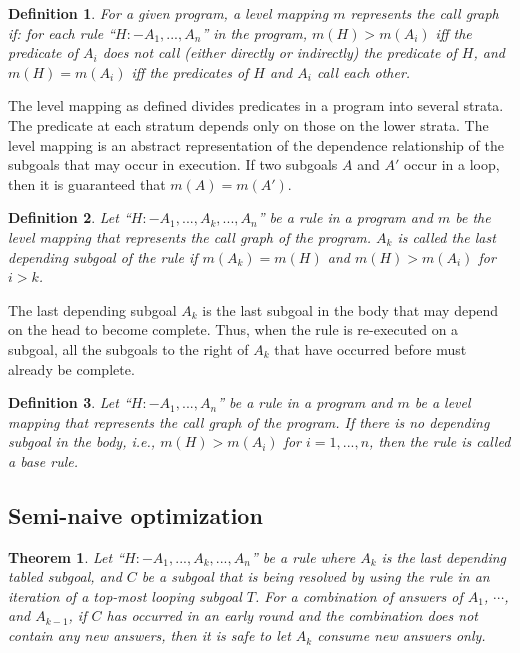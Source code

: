 \documentclass{tlp}
\newtheorem{definition}{Definition} \newtheorem{example}{Example} \newcommand{\pivot}[1]{\mathbin{\, {#1} \,}}
\begin{document}
\begin{definition} {\rm For a given program, a level mapping $m$ represents the {\it call graph} if: for each rule ``$H$$:$$-$$A_1,...,A_n$'' in the program,  $m(H)>m(A_i)$ iff the predicate of $A_i$ does not call (either directly or indirectly) the predicate of $H$, and $m(H)=m(A_i)$ iff the predicates of $H$ and $A_i$ call each other.}
\end{definition}

The level mapping as defined divides predicates in a program into several strata. The predicate at each stratum depends only on those on the lower strata. The level mapping is an abstract representation of the dependence relationship of the subgoals that may occur in execution. If two subgoals $A$ and $A'$ occur in a loop, then it is guaranteed that $m(A)=m(A')$.

\begin{definition} {\rm Let ``$H$$:$$-$$A_1,...,A_k,...,A_n$'' be a rule in a program and $m$ be the level mapping that represents the call graph of the program. $A_k$ is called the {\it last depending subgoal} of the rule if $m(A_k)=m(H)$ and $m(H)>m(A_i)$ for $i>k$.}
\end{definition}

The last depending subgoal $A_k$ is the last subgoal in the body that may depend on the head to become complete. Thus, when the rule is re-executed on a subgoal, all the subgoals to the right of $A_k$ that have occurred before must already be complete. 

\begin{definition} {\rm Let ``$H$$:$$-$$A_1,...,A_n$'' be a rule in a program and $m$ be a level mapping that represents the call graph of the program. If there is no depending subgoal in the body, i.e., $m(H)>m(A_i)$ for $i=1,...,n$, then the rule is called a {\it base rule}}.
\end{definition}

\subsection{Semi-naive optimization}
\newtheorem{theorem}{Theorem}
\begin{theorem}
Let ``$H$$:$$-$$A_1,...,A_k,...,A_n$'' be a rule where $A_k$ is the last depending tabled subgoal, and $C$ be a subgoal that is being resolved by using the rule in an iteration of a top-most looping subgoal $T$. For a combination of answers of $A_1$, $\cdots$, and $A_{k-1}$, if $C$ has occurred in an early round and the combination does not contain any new answers, then it is safe to let $A_k$ consume new answers only. 
\end{theorem}
\end{document}
